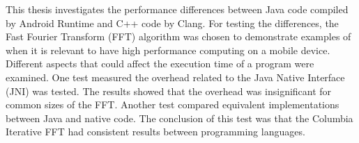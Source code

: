This thesis investigates the performance differences between Java code compiled by Android Runtime and C++ code by Clang. For testing the differences, the Fast Fourier Transform (FFT) algorithm was chosen to demonstrate examples of when it is relevant to have high performance computing on a mobile device. Different aspects that could affect the execution time of a program were examined. One test measured the overhead related to the Java Native Interface (JNI) was tested. The results showed that the overhead was insignificant for common sizes of the FFT. Another test compared equivalent implementations between Java and native code. The conclusion of this test was that the Columbia Iterative FFT had consistent results between programming languages.

